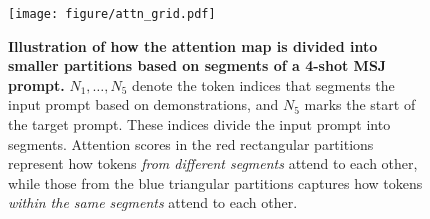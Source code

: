 \begin{figure}[t]
    \centering
    {\texttt{[image: figure/attn\_grid.pdf]}}
    \vspace{-0.3cm}
    \caption{\textbf{Illustration of how the attention map is divided into smaller partitions based on segments of a 4-shot MSJ prompt.} $N_1, \dotsc, N_5$ denote the token indices that segments the input prompt based on demonstrations, and $N_5$ marks the start of the target prompt. These indices divide the input prompt into segments. Attention scores in the red rectangular partitions represent how tokens \textit{from different segments} attend to each other, while those from the blue triangular partitions captures how tokens \textit{within the same segments} attend to each other.}
    \label{fig:attn_grid}
    \vspace{-0.4cm}
\end{figure}


